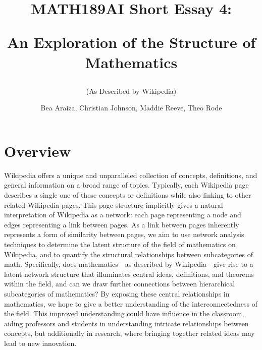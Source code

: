 \documentclass[10pt]{paper}
\begin{document}
\title{MATH189AI Short Essay 4: 

An Exploration of the Structure of Mathematics}
\subtitle{(As Described by Wikipedia)}
\author{Bea Araiza, Christian Johnson, Maddie Reeve, Theo Rode }



\maketitle

\section{Overview}

Wikipedia offers a unique and unparalleled collection of concepts, definitions, and general information on a broad range of topics. 
Typically, each Wikipedia page describes a single one of these concepts or definitions while also linking to other related Wikipedia pages. 
This page structure implicitly gives a natural interpretation of Wikipedia as a network: each page representing a node and edges representing a link between pages. 
As a link between pages inherently represents a form of similarity between pages, we aim to use network analysis techniques to determine the latent structure of the field of mathematics on Wikipedia, and to quantify the structural relationships between subcategories of math. 
Specifically, does mathematics---as described by Wikipedia---give rise to a latent network structure that illuminates central ideas, definitions, and theorems within the field, and can we draw further connections between hierarchical subcategories of mathematics?
By exposing these central relationships in mathematics, we hope to give a better understanding of the interconnectedness of the field. This improved understanding could have influence in the classroom, aiding professors and students in understanding intricate relationships between concepts, but additionally in research, where bringing together related ideas may lead to new innovation. 
\end{document}
